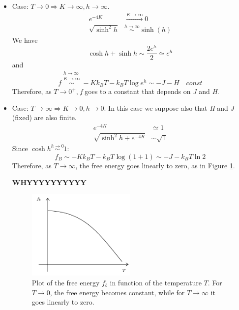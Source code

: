 \documentclass[../../Main/Main.tex]{subfiles}
\begin{document}
\begin{itemize}
\item Case: \( T \rightarrow 0  \Rightarrow K \rightarrow \infty , h \rightarrow \infty  \).
\begin{subequations}
\begin{align*}
  e^{-4K} & \overset{K \rightarrow \infty }{\longrightarrow} 0  \\
  \sqrt{\sinh^2 h} & \overset{h \rightarrow \infty }{\sim } \sinh (h)
\end{align*}
\end{subequations}
We have 
\begin{equation*}
\cosh h + \sinh h \sim \frac{2 e^{h} }{2} \simeq e^{h}
\end{equation*}
and
\begin{equation}
  f \overset{\substack{h \rightarrow \infty  \\ K \rightarrow \infty  } }{\sim } - K k_B T - k_B T \log{e^{h} } \sim -J -H \quad const
\end{equation}
Therefore, as \( T \rightarrow 0^+ \), \emph{f} goes to a constant that depends on \emph{J} and \emph{H}.

\item  Case: \( T \rightarrow \infty   \Rightarrow K \rightarrow 0 , h \rightarrow 0  \).
In this case we suppose also that \emph{H} and \emph{J} (fixed) are also finite.
\begin{subequations}
\begin{align*}
  e^{-4K} & \simeq 1  \\
  \sqrt{\sinh^2 h + e^{-4K} } & \sim \sqrt{1}
\end{align*}
\end{subequations}
Since \( \cosh h \overset{h \rightarrow 0}{\sim } 1  \):
\begin{equation}
  f_B \sim  -K k_B T - k_B T \log{(1+1)} \sim  -J -k_B T \ln{2}
\end{equation}
Therefore, as \( T \rightarrow \infty  \), the free energy goes linearly to zero, as in Figure \ref{fig:8_1}.

\textbf{WHYYYYYYYYYY}


\begin{figure}[h!]
\centering
\includegraphics[width=0.5\textwidth]{./img/1.pdf}
\caption{\label{fig:8_1} Plot of the free energy \( f_b \) in function of the temperature \( T \). For \( T \rightarrow 0 \), the free energy becomes constant, while for \( T \rightarrow \infty  \) it goes linearly to zero.  }
\end{figure}
\end{itemize}
\end{document}
